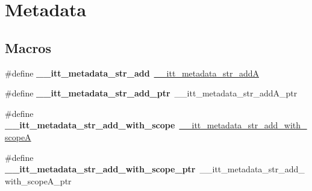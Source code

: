 \hypertarget{group__metadata}{}\section{Metadata}
\label{group__metadata}
\subsection*{Macros}
\begin{DoxyCompactItemize}
\item 
\hypertarget{group__metadata_gabd5fb0265c614e638f36fb465c372e8d}{}\#define {\bfseries \+\_\+\+\_\+itt\+\_\+metadata\+\_\+str\+\_\+add}~\hyperlink{group__metadata_ga1c0cbd4717ce08bf6a83fc84bf0a58e2}{\+\_\+\+\_\+itt\+\_\+metadata\+\_\+str\+\_\+add\+A}\label{group__metadata_gabd5fb0265c614e638f36fb465c372e8d}

\item 
\hypertarget{group__metadata_ga8ebe7302eaf9f291ede62e0f49c846ce}{}\#define {\bfseries \+\_\+\+\_\+itt\+\_\+metadata\+\_\+str\+\_\+add\+\_\+ptr}~\+\_\+\+\_\+itt\+\_\+metadata\+\_\+str\+\_\+add\+A\+\_\+ptr\label{group__metadata_ga8ebe7302eaf9f291ede62e0f49c846ce}

\item 
\hypertarget{group__metadata_gad1d57296dfdaf252ba36eedc7954bd20}{}\#define {\bfseries \+\_\+\+\_\+itt\+\_\+metadata\+\_\+str\+\_\+add\+\_\+with\+\_\+scope}~\hyperlink{group__metadata_ga4c53d5ec2eebfd017f3867239750a0ec}{\+\_\+\+\_\+itt\+\_\+metadata\+\_\+str\+\_\+add\+\_\+with\+\_\+scope\+A}\label{group__metadata_gad1d57296dfdaf252ba36eedc7954bd20}

\item 
\hypertarget{group__metadata_gab7da5c687a7bd71d3206bfb1bfcf0e91}{}\#define {\bfseries \+\_\+\+\_\+itt\+\_\+metadata\+\_\+str\+\_\+add\+\_\+with\+\_\+scope\+\_\+ptr}~\+\_\+\+\_\+itt\+\_\+metadata\+\_\+str\+\_\+add\+\_\+with\+\_\+scope\+A\+\_\+ptr\label{group__metadata_gab7da5c687a7bd71d3206bfb1bfcf0e91}

\end{DoxyCompactItemize}
